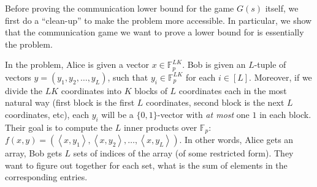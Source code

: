 \documentclass[11pt]{article}
\begin{document}
Before proving the communication lower bound for the game $G(s)$ itself, we first do a ``clean-up'' to make the problem more accessible. In particular, we show that the communication game we want to prove a lower bound for is essentially the \emph{\mi{}} problem. 

In the \mi{} problem, Alice is given a vector $x\in \mathbb{F}_p^{LK}$. Bob is given an $L$-tuple of vectors $y=(y_1,y_2,\ldots,y_L)$, such that $y_i\in \mathbb{F}_p^{LK}$ for each $i\in[L]$. Moreover, if we divide the $LK$ coordinates into $K$ blocks of $L$ coordinates each in the most natural way (first block is the first $L$ coordinates, second block is the next $L$ coordinates, etc), each $y_i$ will be a $\{0,1\}$-vector with \emph{at most} one $1$ in each block. Their goal is to compute the $L$ inner products over $\mathbb{F}_p$: $f(x, y)=(\left<x,y_1\right>,\left<x,y_2\right>,\ldots,\left<x,y_L\right>)$. In other words, Alice gets an array, Bob gets $L$ sets of indices of the array (of some restricted form). They want to figure out together for each set, what is the sum of elements in the corresponding entries. 
\end{document}
